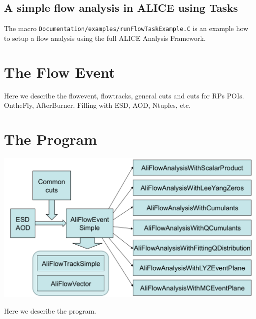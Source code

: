 \documentclass[a5paper]{book}
\numberwithin{equation}{subsection}
\begin{document}
\section{A simple flow analysis in ALICE using Tasks}
The macro \texttt{Documentation/examples/runFlowTaskExample.C} is an example how to setup a flow analysis using the full ALICE Analysis Framework.


\chapter{The Flow Event}
\label{flowevent}
Here we describe the flowevent, flowtracks, general cuts and cuts for RPs POIs.
OntheFly, AfterBurner. Filling with ESD, AOD, Ntuples, etc.  

\chapter{The Program}
\label{The Program}
\begin{center}
	\includegraphics[width=1.\textwidth]{figs/flowChart.png}
\end{center}
Here we describe the program.
\end{document}
